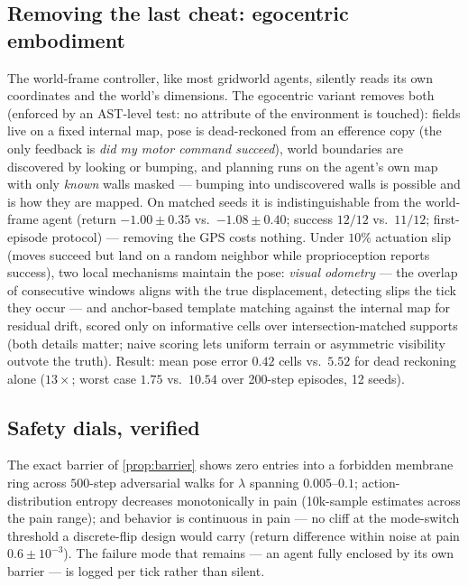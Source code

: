 \documentclass[11pt]{article}
\begin{document}
\subsection{Removing the last cheat: egocentric embodiment}
\label{sec:ego}
The world-frame controller, like most gridworld agents, silently reads its own coordinates and the world's dimensions. The egocentric variant removes both (enforced by an AST-level test: no attribute of the environment is touched): fields live on a fixed internal map, pose is dead-reckoned from an efference copy (the only feedback is \emph{did my motor command succeed}), world boundaries are discovered by looking or bumping, and planning runs on the agent's own map with only \emph{known} walls masked --- bumping into undiscovered walls is possible and is how they are mapped. On matched seeds it is indistinguishable from the world-frame agent (return $-1.00\pm0.35$ vs.\ $-1.08\pm0.40$; success $12/12$ vs.\ $11/12$; first-episode protocol) --- removing the GPS costs nothing. Under $10\%$ actuation slip (moves succeed but land on a random neighbor while proprioception reports success), two local mechanisms maintain the pose: \emph{visual odometry} --- the overlap of consecutive windows aligns with the true displacement, detecting slips the tick they occur --- and anchor-based template matching against the internal map for residual drift, scored only on informative cells over intersection-matched supports (both details matter; naive scoring lets uniform terrain or asymmetric visibility outvote the truth). Result: mean pose error $\mathbf{0.42}$ cells vs.\ $5.52$ for dead reckoning alone ($13\times$; worst case $1.75$ vs.\ $10.54$ over 200-step episodes, 12 seeds).

\subsection{Safety dials, verified}
The exact barrier of \cref{prop:barrier} shows zero entries into a forbidden membrane ring across $500$-step adversarial walks for $\lambda$ spanning $0.005$--$0.1$; action-distribution entropy decreases monotonically in pain (10k-sample estimates across the pain range); and behavior is continuous in pain --- no cliff at the mode-switch threshold a discrete-flip design would carry (return difference within noise at pain $0.6\pm10^{-3}$). The failure mode that remains --- an agent fully enclosed by its own barrier --- is logged per tick rather than silent.
\end{document}
